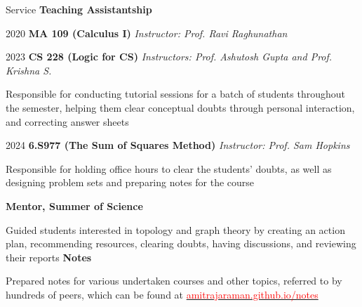 
\begin{rubric}{Service}
    \entry* \textbf{Teaching Assistantship}

       2020 \quad \textbf{MA 109 (Calculus I)} \hfill \emph{Instructor: Prof. Ravi Raghunathan}

       2023 \quad \textbf{CS 228 (Logic for CS)} \hfill  \emph{Instructors: Prof. Ashutosh Gupta and Prof. Krishna S.}

	    Responsible for conducting tutorial sessions for a batch of students throughout the semester, helping them clear conceptual doubts through personal interaction, and correcting answer sheets

       2024 \quad \textbf{6.S977 (The Sum of Squares Method)} \hfill \emph{Instructor: Prof. Sam Hopkins}

       Responsible for holding office hours to clear the students' doubts, as well as designing problem sets and preparing notes for the course 



	\entry*[2021--2022] \textbf{Mentor, Summer of Science}

		Guided students interested in topology and graph theory by creating an action plan, recommending resources, clearing doubts, having discussions, and reviewing their reports
	\entry*[2020--2023] \textbf{Notes}

		Prepared notes for various undertaken courses and other topics, referred to by hundreds of peers, which can be found at \href{https://amitrajaraman.github.io/notes}{\textcolor{red}{amitrajaraman.github.io/notes}}
\end{rubric}